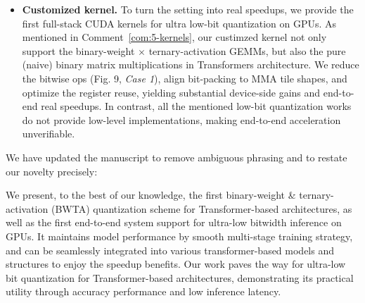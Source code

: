 \begin{revresponse}[]
\begin{itemize}
    \item \textbf{Customized kernel. } To turn the setting into real speedups, we provide the first full-stack CUDA kernels for ultra low-bit quantization on GPUs. As mentioned in Comment~\ref{com:5-kernels}, our custimzed kernel not only support the binary-weight $\times$ ternary-activation GEMMs, but also the pure (naive) binary matrix multiplications in Transformers architecture. We reduce the bitwise ops (Fig. 9, \textit{Case 1}), align bit-packing to MMA tile shapes, and optimize the register reuse, yielding substantial device-side gains and end-to-end real speedups. 
    In contrast, all the mentioned low-bit quantization works do not provide low-level implementations, making end-to-end acceleration unverifiable. 
\end{itemize}

We have updated the manuscript to remove ambiguous phrasing and to restate our novelty precisely:
\begin{changes}
We present, to the best of our knowledge, the first binary-weight \& ternary-activation (BWTA) quantization scheme for Transformer-based architectures, as well as the first end-to-end system support for ultra-low bitwidth inference on GPUs. It maintains model performance by smooth multi-stage training strategy, and can be seamlessly integrated into various transformer-based models and structures to enjoy the speedup benefits. Our work paves the way for ultra-low bit quantization for Transformer-based architectures, demonstrating its practical utility through accuracy performance and low inference latency. 
\end{changes}

\end{revresponse}

